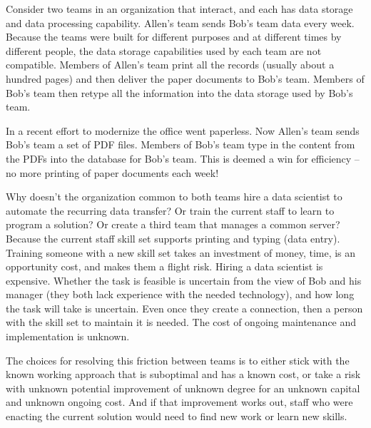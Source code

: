 \begin{mdframed}[frametitle={Data Transfer from one Team to Another},frametitlerule=true,frametitlealignment=\centering]
Consider two teams in an organization that interact, and each has data storage and data processing capability. Allen's team sends Bob's team data every week. Because the teams were built for different purposes and at different times by different people, the data storage capabilities used by each team are not compatible. Members of Allen's team print all the records (usually about a hundred pages) and then deliver the paper documents to Bob's team. Members of Bob's team then retype all the information into the data storage used by Bob's team.

In a recent effort to modernize the office went paperless. Now Allen's team sends Bob's team a set of PDF files. Members of Bob's team type in the content from the PDFs into the database for Bob's team. This is deemed a win for efficiency -- no more printing of paper documents each week!

Why doesn't the organization common to both teams hire a data scientist to automate the recurring data transfer? Or train the current staff to learn to program a solution? Or create a third team that manages a common server?
Because the current staff skill set supports printing and typing (data entry). Training someone with a new skill set takes an investment of money, time, is an opportunity cost, and makes them a flight risk.
Hiring a data scientist is expensive. Whether the task is feasible is uncertain from the view of Bob and his manager (they both lack experience with the needed technology), and how long the task will take is uncertain. Even once they create a connection, then a person with the skill set to maintain it is needed. The cost of ongoing maintenance and implementation is unknown.

\end{mdframed}
The choices for resolving this friction between teams is to either stick with the known working approach that is suboptimal and has a known cost, or take a risk with unknown potential improvement of unknown degree for an unknown capital and unknown ongoing cost.
And if that improvement works out, staff who were enacting the current solution would need to find new work or learn new skills.
